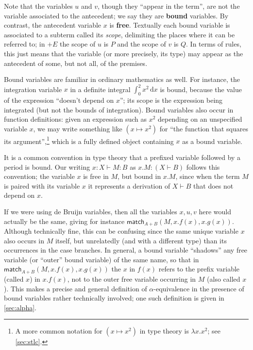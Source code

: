 \documentclass{book}
\let\types\vdash
\def\plusE{\mathord{+}E}
\def\acase#1#2{\mathsf{match}_{#1+#2}}
\begin{document}
Note that the variables $u$ and $v$, though they ``appear in the term'', are not the variable associated to the antecedent;
we say they are \textbf{bound} variables.
By contrast, the antecedent variable $x$ is \textbf{free}.
Textually each bound variable is associated to a subterm called its \textit{scope}, delimiting the places where it can be referred to;
in $\plusE$ the scope of $u$ is $P$ and the scope of $v$ is $Q$.
In terms of rules, this just means that the variable (or more precisely, its type) may appear as the antecedent of some, but not all, of the premises.

Bound variables are familiar in ordinary mathematics as well.
For instance, the integration variable $x$ in a definite integral $\int_0^2 x^2\,\mathrm{d}x$ is bound, because the value of the expression ``doesn't depend on $x$''; its scope is the expression being integrated (but not the bounds of integration).
Bound variables also occur in function definitions: given an expression such as $x^2$ depending on an unspecified variable $x$, we may write something like $(x\mapsto x^2)$ for ``the function that squares its argument'',\footnote{A more common notation for $(x\mapsto x^2)$ in type theory is $\lambda x.x^2$; see \cref{sec:stlc}.} which is a fully defined object containing $x$ as a bound variable.

It is a common convention in type theory that a prefixed variable followed by a period is bound.
Our writing $x:X\types M:B$ as $x.M:(X\types B)$ follows this convention; the variable $x$ is free in $M$, but bound in $x.M$, since when the term $M$ is paired with its variable $x$ it represents a derivation of $X\types B$ that does not depend on $x$.

If we were using de Bruijn variables, then all the variables $x,u,v$ here would actually be the same, giving for instance $\acase AB(M,x.f(x),x.g(x))$.
Although technically fine, this can be confusing since the same unique variable $x$ also occurs in $M$ itself, but unrelatedly (and with a different type) than its occurrences in the case branches.
In general, a bound variable ``shadows'' any free variable (or ``outer'' bound variable) of the same name, so that in $\acase AB(M,x.f(x),x.g(x))$ the $x$ in $f(x)$ refers to the prefix variable (called $x$) in $x.f(x)$, not to the outer free variable occurring in $M$ (also called $x$).
This makes a precise and general definition of $\alpha$-equivalence in the presence of bound variables rather technically involved; one such definition is given in \cref{sec:alpha}.
\end{document}
